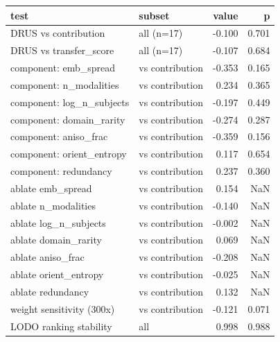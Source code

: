 \begin{tabular}{llrr}
\toprule
test & subset & value & p \\
\midrule
DRUS vs contribution & all (n=17) & -0.100 & 0.701 \\
DRUS vs transfer\_score & all (n=17) & -0.107 & 0.684 \\
component: emb\_spread & vs contribution & -0.353 & 0.165 \\
component: n\_modalities & vs contribution & 0.234 & 0.365 \\
component: log\_n\_subjects & vs contribution & -0.197 & 0.449 \\
component: domain\_rarity & vs contribution & -0.274 & 0.287 \\
component: aniso\_frac & vs contribution & -0.359 & 0.156 \\
component: orient\_entropy & vs contribution & 0.117 & 0.654 \\
component: redundancy & vs contribution & 0.237 & 0.360 \\
ablate emb\_spread & vs contribution & 0.154 & NaN \\
ablate n\_modalities & vs contribution & -0.140 & NaN \\
ablate log\_n\_subjects & vs contribution & -0.002 & NaN \\
ablate domain\_rarity & vs contribution & 0.069 & NaN \\
ablate aniso\_frac & vs contribution & -0.208 & NaN \\
ablate orient\_entropy & vs contribution & -0.025 & NaN \\
ablate redundancy & vs contribution & 0.132 & NaN \\
weight sensitivity (300x) & vs contribution & -0.121 & 0.071 \\
LODO ranking stability & all & 0.998 & 0.988 \\
\bottomrule
\end{tabular}
